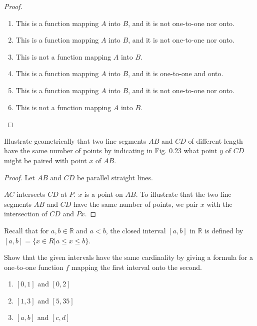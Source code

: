 \begin{proof}
    \begin{enumerate}[label={\textbf{\alph*.}},itemsep=0pt]
        \item This is a function mapping $A$ into $B$, and it is not one-to-one nor onto.
        \item This is a function mapping $A$ into $B$, and it is not one-to-one nor onto.
        \item This is not a function mapping $A$ into $B$.
        \item This is a function mapping $A$ into $B$, and it is one-to-one and onto.
        \item This is a function mapping $A$ into $B$, and it is not one-to-one nor onto.
        \item This is not a function mapping $A$ into $B$.
    \end{enumerate}
\end{proof}

\begin{exercise}
    Illustrate geometrically that two line segments $AB$ and $CD$ of different length have the same number of points by indicating in Fig. 0.23 what point $y$ of $CD$ might be paired with point $x$ of $AB$.
\end{exercise}

\begin{proof}
    Let $AB$ and $CD$ be parallel straight lines.

    $AC$ intersects $CD$ at $P$. $x$ is a point on $AB$. To illustrate that the two line segments $AB$ and $CD$ have the same number of points, we pair $x$ with the intersection of $CD$ and $Px$.
\end{proof}

\begin{exercise}
    Recall that for $a, b \in\mathbb{R}$ and $a < b$, the closed interval $[a, b]$ in $\mathbb{R}$ is defined by $[a, b] = \{ x \in R \vert a \le x \le b \}$.

    Show that the given intervals have the same cardinality by giving a formula for a one-to-one function $f$ mapping the first interval onto the second.
    \begin{enumerate}[label={\textbf{\alph*.}},itemsep=0pt]
        \item $[0, 1]$ and $[0, 2]$
        \item $[1, 3]$ and $[5, 35]$
        \item $[a, b]$ and $[c, d]$
    \end{enumerate}
\end{exercise}

